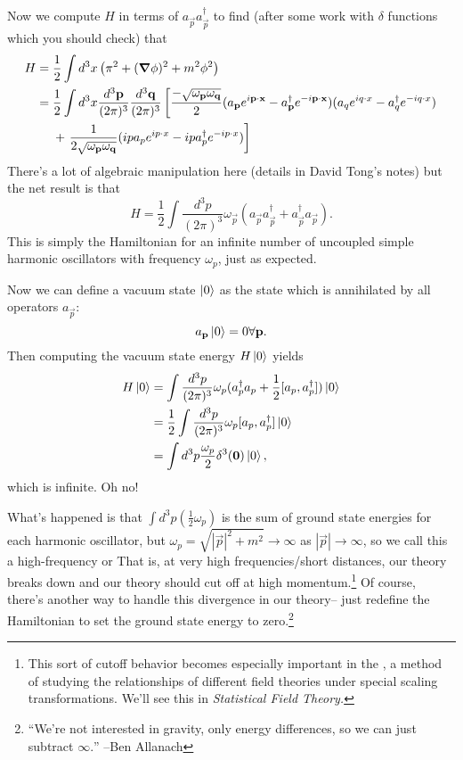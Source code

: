 Now we compute $H$ in terms of $a_{\vec p} a_{\vec p}^\dagger$ to find (after some work with $\delta$ functions which you should check) that
\begin{align*}
H={}&\frac{1}{2}\int d^3 x \left( \pi^2+(\mbox{\boldmath$ \nabla $} \phi)^2+m^2\phi^2\right)\\
={}& \frac{1}{2}\int d^3x \frac{d^3 \boldsymbol{\mathbf{p}}}{(2\pi)^3} \frac{d^3 \boldsymbol{\mathbf{q}}}{(2\pi)^3} \left[ \frac{-\sqrt{\omega_{\boldsymbol{\mathbf{p}}}\omega_{\boldsymbol{\mathbf{q}}}}}{2}(a_{\boldsymbol{\mathbf{p}}} e^{i\boldsymbol{\mathbf{p}} \cdot \boldsymbol{\mathbf{x}}}-a^\dagger_{\boldsymbol{\mathbf{p}}} e^{-i \boldsymbol{\mathbf{p}} \cdot \boldsymbol{\mathbf{x}}})(a_q e^{iq \cdot x}-a_q^\dagger e^{-i q\cdot x})\right.\\
&+\left.\frac{1}{2\sqrt{\omega_{\boldsymbol{\mathbf{p}}}\omega_{\boldsymbol{\mathbf{q}}}}}(ip a_p e^{ip\cdot x}-ip a_p^\dagger e^{-i p\cdot x}) \right]
\end{align*}
There's a lot of algebraic manipulation here (details in David Tong's notes) but the net result is that
$$H=\frac{1}{2} \int \frac{d^3p}{(2\pi)^3} \omega_{\vec p}(a_{\vec p} a_{\vec p}^\dagger + a_{\vec p}^\dagger a_{\vec p}).$$
This is simply the Hamiltonian for an infinite number of uncoupled simple harmonic oscillators with frequency $\omega_p$, just as expected.

Now we can define a vacuum state $\left| 0 \right>$ as the state which is annihilated by all operators $a_{\vec p}$: 
$$a_{\boldsymbol{\mathbf{p}}}\left| 0 \right>=0 \forall \boldsymbol{\mathbf{p}}.$$
Then computing the vacuum state energy $H\left| 0 \right>$ yields
\begin{align*}
H\left| 0 \right>&=\int \frac{d^3p}{(2\pi)^3}\omega_p (a_p^\dagger a_p + \frac{1}{2}[a_p, a_p^\dagger])\left| 0 \right>\\
&=\frac{1}{2}\int \frac{d^3 p}{(2\pi)^3}\omega_p [a_p, a^\dagger_p] \left| 0 \right>\\
&= \int d^3 p \frac{\omega_p}{2} \delta^3 (\boldsymbol{\mathbf{0}})\left| 0 \right>,
\end{align*}
which is infinite. Oh no!

What's happened is that $\int d^3p \left(\frac{1}{2}\omega_p\right)$ is the sum of ground state energies for each harmonic oscillator, but $\omega_p =\sqrt{|\vec p|^2 + m^2} \to \infty$ as $|\vec p|\to \infty$, so we call this a high-frequency or  That is, at very high frequencies/short distances, our theory breaks down and our theory should cut off at high momentum.\footnote{This sort of cutoff behavior becomes especially important in the , a method of studying the relationships of different field theories under special scaling transformations. We'll see this in \emph{Statistical Field Theory.}} Of course, there's another way to handle this divergence in our theory-- just redefine the Hamiltonian to set the ground state energy to zero.\footnote{``We're not interested in gravity, only energy differences, so we can just subtract $\infty.$'' --Ben Allanach}

